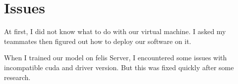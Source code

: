 
\section{Issues}

At first, I did not know what to do with our virtual machine. 
I asked my teammates then figured out how to deploy our software on it. 

When I trained our model on felis Server, 
I encountered some issues with incompatible cuda and driver version. 
But this was fixed quickly after some research. 





